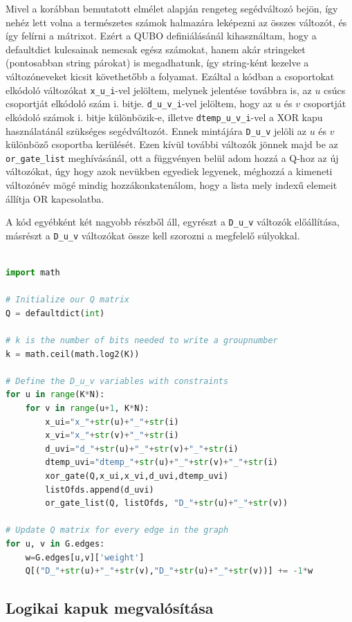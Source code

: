 Mivel a korábban bemutatott elmélet alapján rengeteg segédváltozó bejön, így nehéz lett volna a természetes számok halmazára leképezni az összes változót, és így felírni a mátrixot. Ezért a QUBO definiálásánál kihasználtam, hogy a defaultdict kulcsainak nemcsak egész számokat, hanem akár stringeket (pontosabban string párokat) is megadhatunk, így string-ként kezelve a változóneveket kicsit követhetőbb a folyamat. Ezáltal a kódban a csoportokat elkódoló változókat \verb+x_u_i+-vel jelöltem, melynek jelentése továbbra is, az $u$ csúcs csoportját elkódoló szám i. bitje. \verb+d_u_v_i+-vel jelöltem, hogy az $u$ és $v$ csoportját elkódoló számok i. bitje különbözik-e, illetve \verb+dtemp_u_v_i+-vel a XOR kapu használatánál szükséges segédváltozót. Ennek mintájára \verb+D_u_v+ jelöli az $u$ és $v$ különböző csoportba kerülését. Ezen kívül további változók jönnek majd be az \verb+or_gate_list+ meghívásánál, ott a függvényen belül adom hozzá a Q-hoz az új változókat, úgy hogy azok nevükben egyediek legyenek, méghozzá a kimeneti változónév mögé mindig hozzákonkatenálom, hogy a lista mely indexű elemeit állítja OR kapcsolatba.

A kód egyébként két nagyobb részből áll, egyrészt a \verb+D_u_v+ változók előállítása, másrészt a  \verb+D_u_v+ változókat össze kell szorozni a megfelelő súlyokkal.

\begin{lstlisting}[language=python,caption=Max-K-cut QUBO (bináris kódolás),label=code:maxKCutQUBOBinary]

import math

# Initialize our Q matrix
Q = defaultdict(int)

# k is the number of bits needed to write a groupnumber
k = math.ceil(math.log2(K))

# Define the D_u_v variables with constraints
for u in range(K*N):
	for v in range(u+1, K*N):
		x_ui="x_"+str(u)+"_"+str(i)
		x_vi="x_"+str(v)+"_"+str(i)
		d_uvi="d_"+str(u)+"_"+str(v)+"_"+str(i)
		dtemp_uvi="dtemp_"+str(u)+"_"+str(v)+"_"+str(i)
		xor_gate(Q,x_ui,x_vi,d_uvi,dtemp_uvi)
		listOfds.append(d_uvi)
		or_gate_list(Q, listOfds, "D_"+str(u)+"_"+str(v))

# Update Q matrix for every edge in the graph
for u, v in G.edges:
	w=G.edges[u,v]['weight']
	Q[("D_"+str(u)+"_"+str(v),"D_"+str(u)+"_"+str(v))] += -1*w

\end{lstlisting}

\subsection{Logikai kapuk megvalósítása}

